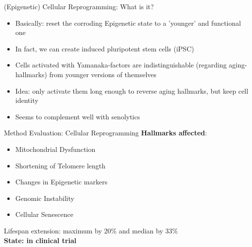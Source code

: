\begin{frame}[c]{(Epigenetic) Cellular Reprogramming: What is it?}
    \large
    \begin{itemize}[<+(1)->]
        \item Basically: reset the corroding Epigenetic state to a 'younger' and functional one
        \item In fact, we can create induced pluripotent stem cells (iPSC) \cite{takahashi2006induction}
        \item Cells activated with Yamanaka-factors are indistinguishable (regarding aging-hallmarks) from younger versions of themselves
        \item Idea: only activate them long enough to reverse aging hallmarks, but keep cell identity
        \item Seems to complement well with senolytics \cite{ofenbauer2019strategies}
    \end{itemize}
\end{frame}


\begin{frame}[c]{Method Evaluation: Cellular Reprogramming}
    \large
    \textbf{Hallmarks affected}: \\
    \begin{itemize}[<+(1)->]
        \item Mitochondrial Dysfunction
        \item Shortening of Telomere length
        \item Changes in Epigenetic markers
        \item Genomic Instability
        \item Cellular Senescence
    \end{itemize}
    \pause
    Lifespan extension: maximum by 20\% and median by 33\% \cite{ocampo2016vivo} \\
    \pause
    \textbf{State: in clinical trial}
\end{frame}

